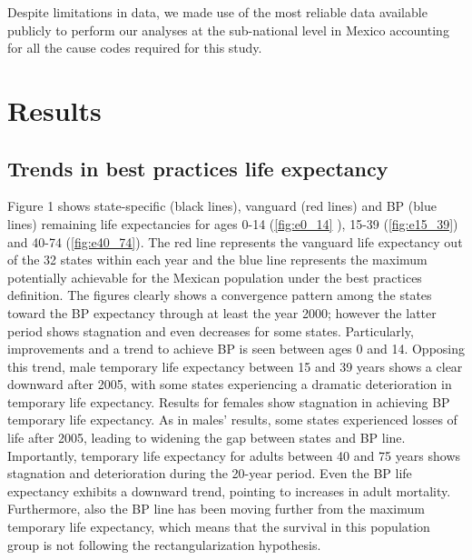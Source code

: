 \documentclass{article}
\begin{document}
Despite limitations in data, we made use of the most reliable data available
publicly to perform our analyses at the sub-national level in Mexico accounting
for all the cause codes required for this study.

\section*{Results}
\subsection*{Trends in best practices life expectancy}

Figure 1 shows state-specific  (black lines), vanguard  (red lines) and BP (blue lines) remaining life expectancies for ages 0-14 (\ref{fig:e0_14} ), 15-39
(\ref{fig:e15_39}) and 40-74 (\ref{fig:e40_74}). The red line represents the
vanguard life expectancy out of the 32 states within each year and the blue line
represents the maximum potentially achievable for the Mexican population under
the best practices definition.
The figures clearly shows a convergence pattern among the states toward the BP
expectancy through at least the year 2000; however the latter period shows
stagnation and even decreases for some states. Particularly, improvements and a trend to achieve BP is seen between ages 0 and 14. Opposing this trend, male temporary life expectancy between 15 and 39 years shows a clear downward after 2005, with some states experiencing a dramatic deterioration in temporary life expectancy. Results for females show stagnation in achieving BP temporary life expectancy. As in males' results, some states experienced losses of life after 2005, leading to widening the gap between states and BP line. 
Importantly, temporary life expectancy for adults between 40 and 75 years shows stagnation and deterioration during the 20-year period. Even the BP life expectancy exhibits a downward trend, pointing to increases in adult mortality. Furthermore, also the BP line has been moving further from the maximum temporary life expectancy, which means that the survival in this population group is not following the rectangularization hypothesis. 
\end{document}
